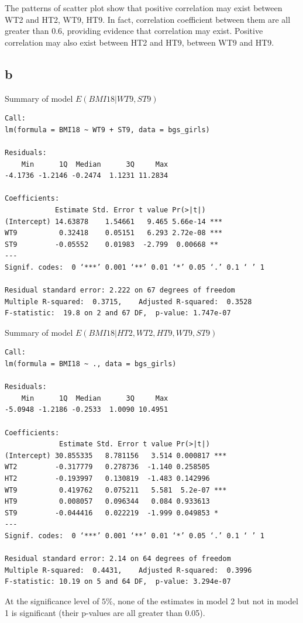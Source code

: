 \documentclass[11pt,letterpaper]{article}
\begin{document}
\noindent The patterns of scatter plot show that positive correlation may exist between WT2 and HT2, WT9, HT9. In fact, correlation coefficient between them are all greater than 0.6, providing evidence that correlation may exist. Positive correlation may also exist between HT2 and HT9, between WT9 and HT9. 

\subsection*{b}
\noindent Summary of model $E(BMI18 | WT9, ST9)$
\begin{verbatim}
Call:
lm(formula = BMI18 ~ WT9 + ST9, data = bgs_girls)

Residuals:
    Min      1Q  Median      3Q     Max 
-4.1736 -1.2146 -0.2474  1.1231 11.2834 

Coefficients:
            Estimate Std. Error t value Pr(>|t|)    
(Intercept) 14.63878    1.54661   9.465 5.66e-14 ***
WT9          0.32418    0.05151   6.293 2.72e-08 ***
ST9         -0.05552    0.01983  -2.799  0.00668 ** 
---
Signif. codes:  0 ‘***’ 0.001 ‘**’ 0.01 ‘*’ 0.05 ‘.’ 0.1 ‘ ’ 1

Residual standard error: 2.222 on 67 degrees of freedom
Multiple R-squared:  0.3715,	Adjusted R-squared:  0.3528 
F-statistic:  19.8 on 2 and 67 DF,  p-value: 1.747e-07
\end{verbatim}

\noindent Summary of model $E(BMI18 | HT2, WT2, HT9, WT9, ST9)$
\begin{verbatim}
Call:
lm(formula = BMI18 ~ ., data = bgs_girls)

Residuals:
    Min      1Q  Median      3Q     Max 
-5.0948 -1.2186 -0.2533  1.0090 10.4951 

Coefficients:
             Estimate Std. Error t value Pr(>|t|)    
(Intercept) 30.855335   8.781156   3.514 0.000817 ***
WT2         -0.317779   0.278736  -1.140 0.258505    
HT2         -0.193997   0.130819  -1.483 0.142996    
WT9          0.419762   0.075211   5.581  5.2e-07 ***
HT9          0.008057   0.096344   0.084 0.933613    
ST9         -0.044416   0.022219  -1.999 0.049853 *  
---
Signif. codes:  0 ‘***’ 0.001 ‘**’ 0.01 ‘*’ 0.05 ‘.’ 0.1 ‘ ’ 1

Residual standard error: 2.14 on 64 degrees of freedom
Multiple R-squared:  0.4431,	Adjusted R-squared:  0.3996 
F-statistic: 10.19 on 5 and 64 DF,  p-value: 3.294e-07
\end{verbatim}

\noindent At the significance level of $5 \%$, none of the estimates in model 2 but not in model 1 is significant (their p-values are all greater than 0.05). 
\end{document}
